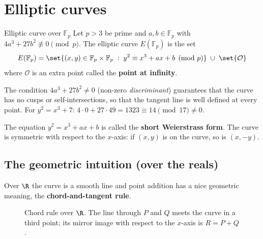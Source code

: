 
\section{Elliptic curves}

\begin{frameddefn}[label={def:ec}]{Elliptic curve over $\mathbb{F}_p$}
  Let $p > 3$ be prime and $a, b \in \mathbb{F}_p$ with $4a^3 + 27b^2 \not\equiv 0 \pmod p$. The elliptic curve $E(\mathbb{F}_p)$ is the set
  \[
    E(\mathbb{F}_p) = \set{(x,y) \in \mathbb{F}_p \times \mathbb{F}_p \;:\; y^2 \equiv x^3 + a x + b \pmod p} \;\cup\; \set{\mathcal{O}}
  \]
  where $\mathcal{O}$ is an extra point called the \textbf{point at infinity}.
\end{frameddefn}

The condition $4a^3 + 27b^2 \neq 0$ (non-zero \textit{discriminant}) guarantees that the curve has no cusps or self-intersections, so that the tangent line is well defined at every point. For $y^2 = x^3 + 7$: $4 \cdot 0 + 27 \cdot 49 = 1323 \equiv 14 \pmod{17} \neq 0$. \checkmark

The equation $y^2 = x^3 + ax + b$ is called the \textbf{short Weierstrass form}. The curve is symmetric with respect to the $x$-axis: if $(x,y)$ is on the curve, so is $(x,-y)$.

\subsection{The geometric intuition (over the reals)}

Over $\R$ the curve is a smooth line and point addition has a nice geometric meaning, the \textbf{chord-and-tangent rule}.

\begin{figure}[H]
  \centering
  \caption{Chord rule over $\R$. The line through $P$ and $Q$ meets the curve in a third point; its mirror image with respect to the $x$-axis is $R = P + Q$.}
  \label{fig:chord}
\end{figure}

